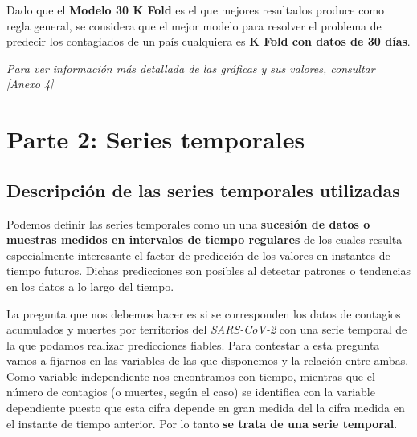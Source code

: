 \documentclass[12pt,a4paper, xcolor=table]{article}
\begin{document}
    \vspace{2mm}

    Dado que el \textbf{Modelo 30 K Fold} es el que mejores resultados produce como regla general, se considera que el mejor modelo para resolver el problema de predecir los contagiados de un país cualquiera es \textbf{K Fold con datos de 30 días}.

    \vspace{6mm}

    \textit{Para ver información más detallada de las gráficas y sus valores, consultar [Anexo 4]}



    \newpage
    \section{Parte 2: Series temporales}

    \subsection{Descripción de las series temporales utilizadas}

        Podemos definir las series temporales como un una \textbf{sucesión de datos o muestras medidos en intervalos de tiempo regulares} de los cuales resulta especialmente interesante el factor de predicción de los valores en instantes de tiempo futuros. Dichas predicciones son posibles al detectar patrones o tendencias en los datos a lo largo del tiempo.

        \vspace{2mm}

        La pregunta que nos debemos hacer es si se corresponden los datos de contagios acumulados y muertes por territorios del  \textit{SARS-CoV-2} con una serie temporal de la que podamos realizar predicciones fiables. Para contestar a esta pregunta vamos a fijarnos en las variables de las que disponemos y la relación entre ambas. Como variable independiente nos encontramos con tiempo, mientras que el número de contagios (o muertes, según el caso) se identifica con la variable dependiente puesto que esta cifra depende en gran medida del la cifra medida en el instante de tiempo anterior. Por lo tanto \textbf{se trata de una serie temporal}.

        \vspace{2mm}
\end{document}
